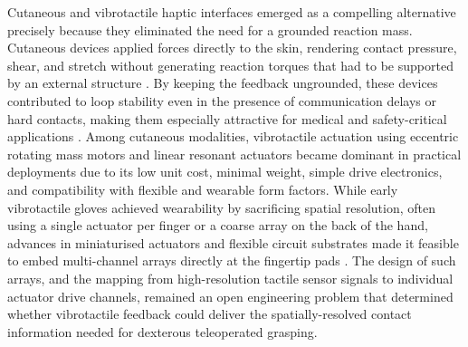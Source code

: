 \documentclass[12pt, a4paper]{report}
\begin{document}
Cutaneous and vibrotactile haptic interfaces emerged as a compelling alternative precisely because they eliminated the need for a grounded reaction mass. Cutaneous devices applied forces directly to the skin, rendering contact pressure, shear, and stretch without generating reaction torques that had to be supported by an external structure \cite{pacchierotti2015}. By keeping the feedback ungrounded, these devices contributed to loop stability even in the presence of communication delays or hard contacts, making them especially attractive for medical and safety-critical applications \cite{pacchierotti2017}. Among cutaneous modalities, vibrotactile actuation using eccentric rotating mass motors and linear resonant actuators became dominant in practical deployments due to its low unit cost, minimal weight, simple drive electronics, and compatibility with flexible and wearable form factors. While early vibrotactile gloves achieved wearability by sacrificing spatial resolution, often using a single actuator per finger or a coarse array on the back of the hand, advances in miniaturised actuators and flexible circuit substrates made it feasible to embed multi-channel arrays directly at the fingertip pads \cite{pacchierotti2017}. The design of such arrays, and the mapping from high-resolution tactile sensor signals to individual actuator drive channels, remained an open engineering problem that determined whether vibrotactile feedback could deliver the spatially-resolved contact information needed for dexterous teleoperated grasping.
\end{document}
